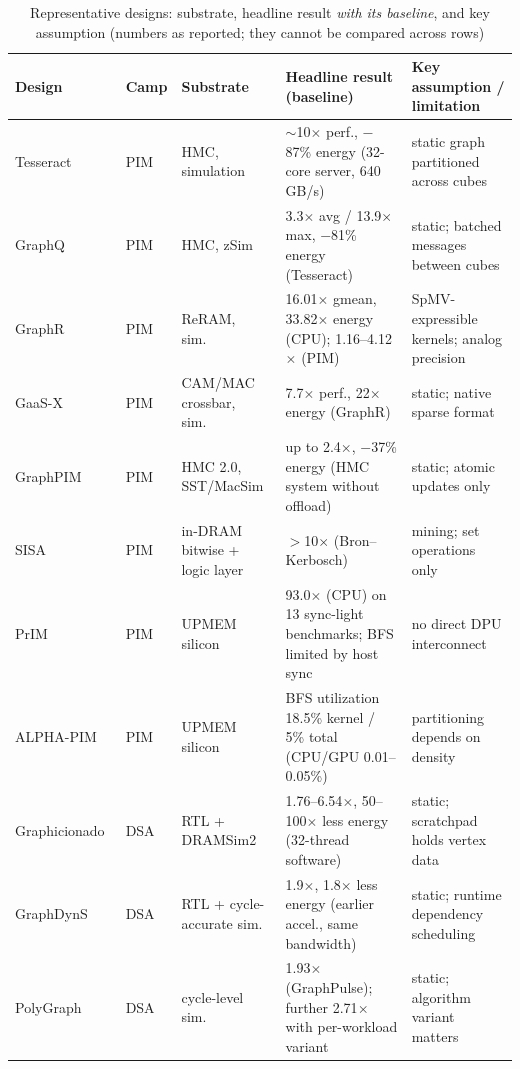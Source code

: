 \documentclass[journal,onecolumn]{IEEEtran}
\begin{document}
\begin{table}[t]
\caption{Representative designs: substrate, headline result \emph{with its baseline}, and key assumption (numbers as reported; they cannot be compared across rows)}
\label{tab:designs}
\centering\footnotesize
\begin{tabularx}{\textwidth}{@{}L{2.3cm}L{1.1cm}L{3.0cm}YL{4.0cm}@{}}
\toprule
Design & Camp & Substrate & Headline result (baseline) & Key assumption / limitation \\
\midrule
Tesseract~\cite{ahn2015tesseract} & PIM & HMC, simulation & $\sim$10$\times$ perf., $-$87\% energy (32-core server, 640\,GB/s) & static graph partitioned across cubes \\
GraphQ~\cite{zhuo2019graphq} & PIM & HMC, zSim & 3.3$\times$ avg / 13.9$\times$ max, $-$81\% energy (Tesseract) & static; batched messages between cubes \\
GraphR~\cite{song2018graphr} & PIM & ReRAM, sim.\ & 16.01$\times$ gmean, 33.82$\times$ energy (CPU); 1.16--4.12$\times$ (PIM) & SpMV-expressible kernels; analog precision \\
GaaS-X~\cite{challapalle2020gaasx} & PIM & CAM/MAC crossbar, sim.\ & 7.7$\times$ perf., 22$\times$ energy (GraphR) & static; native sparse format \\
GraphPIM~\cite{nai2017graphpim} & PIM & HMC 2.0, SST/MacSim & up to 2.4$\times$, $-$37\% energy (HMC system without offload) & static; atomic updates only \\
SISA~\cite{besta2021sisa} & PIM & in-DRAM bitwise + logic layer & $>$10$\times$ (Bron--Kerbosch) & mining; set operations only \\
PrIM~\cite{gomezluna2022prim} & PIM & UPMEM silicon & 93.0$\times$ (CPU) on 13 sync-light benchmarks; BFS limited by host sync & no direct DPU interconnect \\
ALPHA-PIM~\cite{barkhordar2025alphapim} & PIM & UPMEM silicon & BFS utilization 18.5\% kernel / 5\% total (CPU/GPU 0.01--0.05\%) & partitioning depends on density \\
Graphicionado~\cite{ham2016graphicionado} & DSA & RTL + DRAMSim2 & 1.76--6.54$\times$, 50--100$\times$ less energy (32-thread software) & static; scratchpad holds vertex data \\
GraphDynS~\cite{yan2019graphdyns} & DSA & RTL + cycle-accurate sim.\ & 1.9$\times$, 1.8$\times$ less energy (earlier accel., same bandwidth) & static; runtime dependency scheduling \\
PolyGraph~\cite{dadu2021polygraph} & DSA & cycle-level sim.\ & 1.93$\times$ (GraphPulse); further 2.71$\times$ with per-workload variant & static; algorithm variant matters \\

\end{tabularx}
\end{table}
\end{document}
